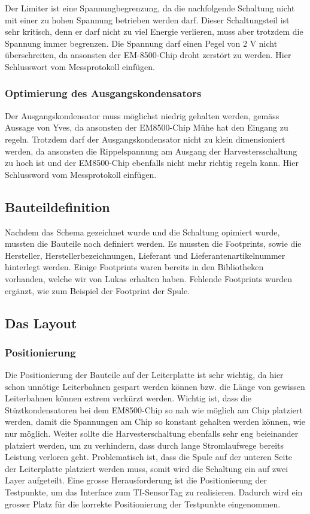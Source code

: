 Der Limiter ist eine Spannungbegrenzung, da die nachfolgende Schaltung nicht mit einer zu hohen Spannung betrieben werden darf. Dieser Schaltungsteil ist sehr kritisch, denn er darf nicht zu viel Energie verlieren, muss aber trotzdem die Spannung immer begrenzen. Die Spannung darf einen Pegel von 2 V nicht überschreiten, da ansonsten der EM-8500-Chip droht zerstört zu werden. 
Hier Schlusswort vom Messprotokoll einfügen.

\subsubsection{Optimierung des Ausgangskondensators}

Der Ausgangskondensator muss möglichst niedrig gehalten werden, gemäss Aussage von Yves, da ansonsten der EM8500-Chip Mühe hat den Eingang zu regeln. Trotzdem darf der Ausgangskondensator nicht zu klein dimensioniert werden, da ansonsten die Rippelspannung am Ausgang der Harvestersschaltung zu hoch ist und der EM8500-Chip ebenfalls nicht mehr richtig regeln kann.
Hier Schlussword vom Messprotokoll einfügen.


\subsection{Bauteildefinition}

Nachdem das Schema gezeichnet wurde und die Schaltung opimiert wurde, mussten die Bauteile noch definiert werden. Es mussten die Footprints, sowie die Hersteller, Herstellerbezeichnungen, Lieferant und Lieferantenartikelnummer hinterlegt werden. Einige Footprints waren bereits in den Bibliotheken vorhanden, welche wir von Lukas erhalten haben. Fehlende Footprints wurden ergänzt, wie zum Beispiel der Footprint der Spule.


\subsection{Das Layout}

\subsubsection{Positionierung}
Die Positionierung der Bauteile auf der Leiterplatte ist sehr wichtig, da hier schon unnötige Leiterbahnen gespart werden können bzw. die Länge von gewissen Leiterbahnen können extrem verkürzt werden.
Wichtig ist, dass die Stüztkondensatoren bei dem EM8500-Chip so nah wie möglich am Chip platziert werden, damit die Spannungen am Chip so konstant gehalten werden können, wie nur möglich.
Weiter sollte die Harvesterschaltung ebenfalls sehr eng beieinander platziert werden, um zu verhindern, dass durch lange Stromlaufwege bereits Leistung verloren geht. Problematisch ist, dass die Spule auf der unteren Seite der Leiterplatte platziert werden muss, somit wird die Schaltung ein auf zwei Layer aufgeteilt.
Eine grosse Herausforderung ist die Positionierung der Testpunkte, um das Interface zum TI-SensorTag zu realisieren. Dadurch wird ein grosser Platz für die korrekte Positionierung der Testpunkte eingenommen.

